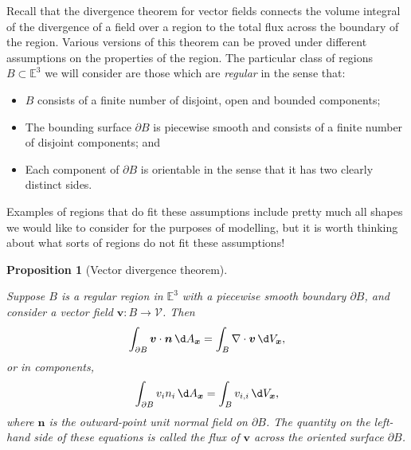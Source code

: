 \documentclass[
  letterpaper,
  DIV=11,
  numbers=noendperiod]{scrreprt}
\theoremstyle{plain}
\newtheorem{proposition}{Proposition}[chapter]
\theoremstyle{remark}
\begin{document}
Recall that the divergence theorem for vector fields connects the volume
integral of the divergence of a field over a region to the total flux
across the boundary of the region. Various versions of this theorem can
be proved under different assumptions on the properties of the region.
The particular class of regions \(B\subset{\mathbb{E}}^3\) we will
consider are those which are \emph{regular} in the sense that:

\begin{itemize}
\item
  \(B\) consists of a finite number of disjoint, open and bounded
  components;
\item
  The bounding surface \(\partial B\) is piecewise smooth and consists
  of a finite number of disjoint components; and
\item
  Each component of \(\partial B\) is orientable in the sense that it
  has two clearly distinct sides.
\end{itemize}

Examples of regions that do fit these assumptions include pretty much
all shapes we would like to consider for the purposes of modelling, but
it is worth thinking about what sorts of regions do not fit these
assumptions!

\begin{proposition}[Vector divergence
theorem]\protect\hypertarget{prp-vectordivtheorem}{}\label{prp-vectordivtheorem}

Suppose \(B\) is a regular region in \({\mathbb{E}}^3\) with a piecewise
smooth boundary \(\partial B\), and consider a vector field
\({\boldsymbol{v}}:B\to{\mathcal{V}}\). Then
\[\int_{\partial B} {\boldsymbol{v}}\cdot{\boldsymbol{n}}{\,\d A_{{\boldsymbol{x}}}}= \int_B\nabla\cdot{\boldsymbol{v}}{\,\d V_{{\boldsymbol{x}}}},\]
or in components,
\[\int_{\partial B}v_in_i {\,\d A_{{\boldsymbol{x}}}}= \int_Bv_{i,i} {\,\d V_{{\boldsymbol{x}}}},\]
where \({\boldsymbol{n}}\) is the outward-point unit normal field on
\(\partial B\). The quantity on the left-hand side of these equations is
called the \emph{flux} of \({\boldsymbol{v}}\) across the oriented
surface \(\partial B\).

\end{proposition}
\end{document}
